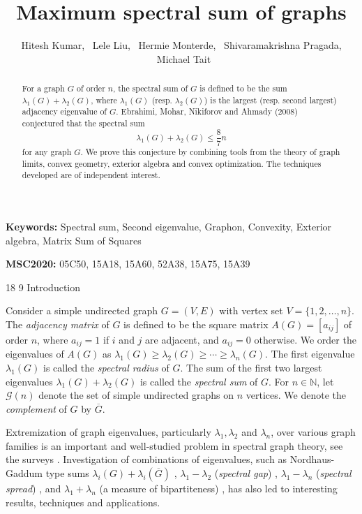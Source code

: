 \documentclass[11pt]{article}
\title{\textbf{Maximum spectral sum of graphs}}
\author{Hitesh Kumar, \ Lele Liu, \ Hermie Monterde, \ Shivaramakrishna Pragada, \ Michael Tait}
\date{}
\makeatletter
\renewcommand\section{\@startsection{section}{1}{\z@}%
{18\p@ \@plus 6\p@ \@minus 3\p@}%
{9\p@ \@plus 6\p@ \@minus 3\p@}%
{\large\bfseries\boldmath}}
\theoremstyle{plain}
\theoremstyle{definition}
\numberwithin{equation}{section}
\makeatother
\begin{document}
\maketitle

\begin{abstract}
For a graph $G$ of order $n$, the spectral sum of $G$ is defined to be the sum $\lambda_1(G) + \lambda_2(G)$, 
where $\lambda_1(G)$ (resp. $\lambda_2(G)$) is the largest (resp. second largest) adjacency eigenvalue of $G$. 
Ebrahimi, Mohar, Nikiforov and Ahmady (2008) conjectured that the spectral sum
\[ 
\lambda_1(G) + \lambda_2(G)\le \frac{8}{7}n
\] 
for any graph $G$. We prove this conjecture by combining tools from the theory of graph limits, 
convex geometry, exterior algebra and convex optimization. The techniques developed are of independent interest.
\end{abstract}

\noindent
\textbf{Keywords:} Spectral sum, Second eigenvalue, Graphon, Convexity, Exterior algebra, Matrix Sum of Squares

\noindent
\textbf{MSC2020:} 05C50, 15A18, 15A60, 52A38, 15A75, 15A39  

\section{Introduction}

Consider a simple undirected graph $G = (V,E)$ with vertex set $V = \{1,2,\ldots,n\}$. 
The \emph{adjacency matrix} of $G$ is defined to be the square matrix $A(G)=[a_{ij}]$ of order $n$, where $a_{ij}=1$ if 
$i$ and $j$ are adjacent, and $a_{ij}=0$ otherwise. We order the eigenvalues of $A(G)$ as 
$\lambda_1(G)\geq\lambda_2(G)\geq\cdots\geq\lambda_n(G)$. The first eigenvalue $\lambda_1(G)$ is called 
the \emph{spectral radius} of $G$. The sum of the first two largest eigenvalues $\lambda_1(G) + \lambda_2(G)$ 
is called the \emph{spectral sum} of $G$. For $n\in \mathbb{N}$, let $\mathcal{G}(n)$ 
denote the set of simple undirected graphs on $n$ vertices. We denote the \emph{complement} of $G$ by $\overline{G}$.

Extremization of graph eigenvalues, particularly $\lambda_1, \lambda_2$ and $\lambda_n$, over various 
graph families is an important and well-studied problem in spectral graph theory, see the 
surveys \cite{Cvetkovic_Rowlinson_1990, Cvetkovic_Simic_1995, Stanic_book}. Investigation of combinations 
of eigenvalues, such as Nordhaus-Gaddum type sums $\lambda_i(G) + \lambda_i(\overline{G})$ 
\cite{Aouchiche_Hansen_2013, Nikiforov_2007, Terpai_2011},  $\lambda_1 - \lambda_2$ 
(\emph{spectral gap}) \cite{Stanic_2013, Stanic_book}, $\lambda_1 - \lambda_n$ (\emph{spectral spread}) 
\cite{Breen_Riasanovsky_Tait_Urschel_2022}, and $\lambda_1 + \lambda_n$ (a measure of bipartiteness) 
\cite{Csikvari_2022}, has also led to interesting results, techniques and applications.
\end{document}

